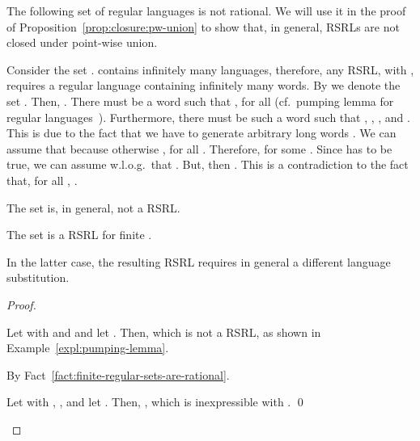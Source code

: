 \documentclass[envcountsame]{llncs}
\newcommand{\RegularlyGeneratedLanguageSetAbbrev}{RSRL\xspace}
\newcommand{\RegularlyGeneratedLanguageSetsAbbrev}{RSRLs\xspace}
\newcommand{\ARegularlyGeneratedLanguageSet}{rational\xspace}
\begin{document}
The following set of regular languages is not \ARegularlyGeneratedLanguageSet.
We will use it in the proof of Proposition~\ref{prop:closure:pw-union} to show that, in general, \RegularlyGeneratedLanguageSetsAbbrev are not closed under point-wise union.
\begin{example}
	\label{expl:pumping-lemma}
Consider the set .
	 contains infinitely many languages, therefore, any \RegularlyGeneratedLanguageSetAbbrev , with , requires a regular language  containing infinitely many words.
	By  we denote the set .
	Then, .
	There must be a word  such that , for all  (cf.~pumping lemma for regular languages~\cite{DBLP:books/aw/HopcroftU79}).
	Furthermore, there must be such a word  such that , , , and .
	This is due to the fact that we have to generate arbitrary long words .
	We can assume that  because otherwise , for all .
	Therefore,  for some .
	Since  has to be true, we can assume w.l.o.g.~that .
	But, then .
	This is a contradiction to the fact that, for all , .
\end{example}


\begin{proposition}
  \label{prop:closure:pw-union}
  \begin{inparaenum}
  \item\label{prop:closure:pw-union:a} The set  is, in general, not a \RegularlyGeneratedLanguageSetAbbrev.
  \item\label{prop:closure:pw-union:b} The set  is a \RegularlyGeneratedLanguageSetAbbrev for finite .
  \item\label{prop:closure:pw-union:c} In the latter case, the
    resulting \RegularlyGeneratedLanguageSetAbbrev requires in general a different language
    substitution.
  \end{inparaenum}
\end{proposition}

\begin{proof}
  \begin{inparaenum}[\bfseries(1)]
  \item Let  with
     and  and let .  Then,  which is not a \RegularlyGeneratedLanguageSetAbbrev, as shown in
    Example~\ref{expl:pumping-lemma}.
  \item By Fact~\ref{fact:finite-regular-sets-are-rational}.
  \item\label{proof:star-free-fixed-alphabet-point-wise-union} Let
     with , , 
    and let .  Then, , which is inexpressible with . \qed
  \end{inparaenum}
\end{proof}
\end{document}
